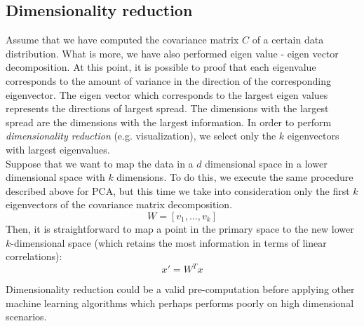 \subsection{Dimensionality reduction}
Assume that we have computed the covariance matrix $C$ of a certain data distribution. What is more, we have also performed eigen value - eigen vector decomposition. At this point, it is possible to proof that each eigenvalue corresponds to the amount of variance in the direction of the corresponding eigenvector. The eigen vector which corresponds to the largest eigen values represents the directions of largest spread. The dimensions with the largest spread are the dimensions with the largest information. In order to perform \textit{dimensionality reduction} (e.g. visualization), we select only the $k$ eigenvectors with largest eigenvalues.\\
Suppose that we want to map the data in a $d$ dimensional space in a lower dimensional space with $k$ dimensions. To do this, we execute the same procedure described above for PCA, but this time we take into consideration only the first $k$ eigenvectors of the covariance matrix decomposition.
\begin{equation*}
    W = [v_1, \hdots, v_k]
\end{equation*}
Then, it is straightforward to map a point in the primary space to the new lower $k$-dimensional space (which retains the most information in terms of linear correlations):
\begin{equation*}
    x' = W^T x
\end{equation*}

Dimensionality reduction could be a valid pre-computation before applying other machine learning algorithms which perhaps performs poorly on high dimensional scenarios.